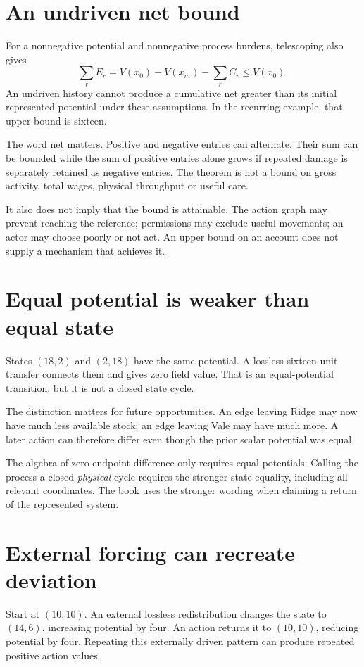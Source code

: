 \section{An undriven net bound}
For a nonnegative potential and nonnegative process burdens, telescoping also gives
\begin{equation}
 \sum_r E_r
 =V(x_0)-V(x_m)-\sum_rC_r\le V(x_0).
\end{equation}
An undriven history cannot produce a cumulative net greater than its initial represented potential under these assumptions. In the recurring example, that upper bound is sixteen.

The word net matters. Positive and negative entries can alternate. Their sum can be bounded while the sum of positive entries alone grows if repeated damage is separately retained as negative entries. The theorem is not a bound on gross activity, total wages, physical throughput or useful care.

It also does not imply that the bound is attainable. The action graph may prevent reaching the reference; permissions may exclude useful movements; an actor may choose poorly or not act. An upper bound on an account does not supply a mechanism that achieves it.

\section{Equal potential is weaker than equal state}
States $(18,2)$ and $(2,18)$ have the same potential. A lossless sixteen-unit transfer connects them and gives zero field value. That is an equal-potential transition, but it is not a closed state cycle.

The distinction matters for future opportunities. An edge leaving Ridge may now have much less available stock; an edge leaving Vale may have much more. A later action can therefore differ even though the prior scalar potential was equal.

The algebra of zero endpoint difference only requires equal potentials. Calling the process a closed \emph{physical} cycle requires the stronger state equality, including all relevant coordinates. The book uses the stronger wording when claiming a return of the represented system.

\section{External forcing can recreate deviation}
Start at $(10,10)$. An external lossless redistribution changes the state to $(14,6)$, increasing potential by four. An action returns it to $(10,10)$, reducing potential by four. Repeating this externally driven pattern can produce repeated positive action values.

